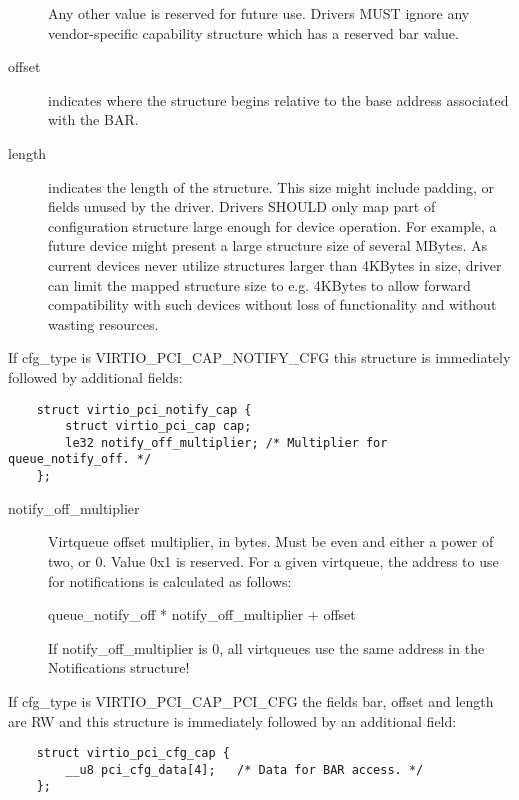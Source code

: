 \begin{description}
        Any other value is reserved for future use. Drivers MUST
        ignore any vendor-specific capability structure which has
        a reserved bar value.

\item[offset]
        indicates where the structure begins relative to the base address associated
        with the BAR.

\item[length]
        indicates the length of the structure.
        This size might include padding, or fields unused by the driver.
        Drivers SHOULD only map part of configuration structure
        large enough for device operation.
        For example, a future device might present a large structure size of several
        MBytes.
        As current devices never utilize structures larger than 4KBytes in size,
        driver can limit the mapped structure size to e.g.
        4KBytes to allow forward compatibility with such devices without loss of
        functionality and without wasting resources.
\end{description}

If cfg_type is VIRTIO_PCI_CAP_NOTIFY_CFG this structure is immediately followed
by additional fields:

\begin{lstlisting}
	struct virtio_pci_notify_cap {
		struct virtio_pci_cap cap;
		le32 notify_off_multiplier;	/* Multiplier for queue_notify_off. */
	};
\end{lstlisting}

\begin{description}
\item[notify_off_multiplier]

        Virtqueue offset multiplier, in bytes. Must be even and either a power of two, or 0.
        Value 0x1 is reserved.
        For a given virtqueue, the address to use for notifications is calculated as follows:

        queue_notify_off * notify_off_multiplier + offset

        If notify_off_multiplier is 0, all virtqueues use the same address in
        the Notifications structure!
\end{description}

If cfg_type is VIRTIO_PCI_CAP_PCI_CFG the fields bar, offset and length are RW
and this structure is immediately followed by an additional field:

\begin{lstlisting}
	struct virtio_pci_cfg_cap {
		__u8 pci_cfg_data[4];	/* Data for BAR access. */
	};
\end{lstlisting}

